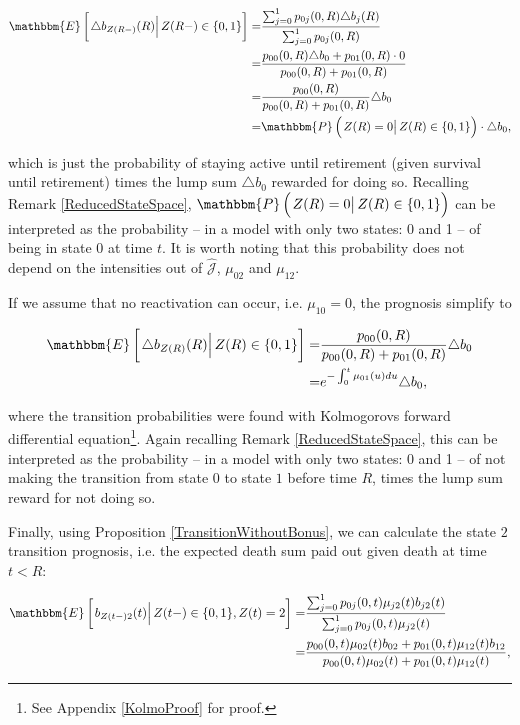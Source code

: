 \documentclass{book}
\newcommand{\1}[1]{\mathbbm{1}_{\left\lbrace #1 \right\rbrace}}
\newcommand{\econd}[2][def]{\mathbbm{E} \left[ \left. #1 \right| #2 \right]}
\newcommand{\pcond}[2][def]{\mathbbm{P} \left( \left. #1 \right| #2 \right)}
\theoremstyle{break}
\theoremstyle{remark}
\numberwithin{equation}{section}
\begin{document}
\begin{example}
\begin{align*}
    \econd[\triangle b_{Z(R-)} (R)]{Z(R-) \in \{ 0,1 \}} =& \frac{\sum_{j = 0}^1 p_{0j}(0,R) \triangle b_j(R)}{\sum_{j = 0}^1 p_{0j}(0,R)} \\
    =&\frac{p_{00}(0,R) \triangle b_0 + p_{01}(0,R) \cdot 0}{p_{00}(0,R) + p_{01}(0,R)} \\
    =& \frac{p_{00}(0,R)}{p_{00}(0,R) + p_{01}(0,R)} \triangle b_0 \\
    =& \pcond[Z(R) = 0]{Z(R) \in \{ 0,1 \}} \cdot \triangle b_0,
\end{align*}
    
which is just the probability of staying active until retirement (given survival until retirement) times the lump sum $\triangle b_0$ rewarded for doing so. Recalling Remark \ref{ReducedStateSpace}, $\pcond[Z(R) = 0]{Z(R) \in \{ 0,1 \}}$ can be interpreted as the probability -- in a model with only two states: 0 and 1 -- of being in state 0 at time $t$. It is worth noting that this probability does not depend on the intensities out of $\hat{\mathcal{J}}$, $\mu_{02}$ and $\mu_{12}$.

If we assume that no reactivation can occur, i.e. $\mu_{10}=0$, the prognosis simplify to

\begin{align*}
\econd[\triangle b_{Z(R)} (R)]{Z(R) \in \{ 0,1 \}} =& \frac{p_{00}(0,R)}{p_{00}(0,R) + p_{01}(0,R)} \triangle b_0 \\
=& e^{-\int_0^t \mu_{01}(u)du} \triangle b_0,
\end{align*}

where the transition probabilities were found with Kolmogorovs forward differential equation\footnote{See Appendix \ref{KolmoProof} for proof.}. Again recalling Remark \ref{ReducedStateSpace}, this can be interpreted as the probability -- in a model with only two states: 0 and 1 -- of not making the transition from state $0$ to state $1$ before time $R$, times the lump sum reward for not doing so.

Finally, using Proposition \ref{TransitionWithoutBonus}, we can calculate the state $2$ transition prognosis, i.e. the expected death sum paid out given death at time $t<R$:

\begin{align*}
    \econd[b_{Z(t-)2}(t)]{Z(t-) \in \{ 0,1 \}, Z(t)=2} =& \frac{\sum_{j=0}^1 p_{0j}(0,t) \mu_{j2}(t) b_{j2}(t)}{\sum_{j=0}^1 p_{0j}(0,t) \mu_{j2}(t)} \\
    =&\frac{p_{00}(0,t) \mu_{02}(t) b_{02} + p_{01}(0,t) \mu_{12}(t) b_{12}}{p_{00}(0,t) \mu_{02}(t) + p_{01}(0,t) \mu_{12}(t)},
\end{align*}


\end{example}
\end{document}
